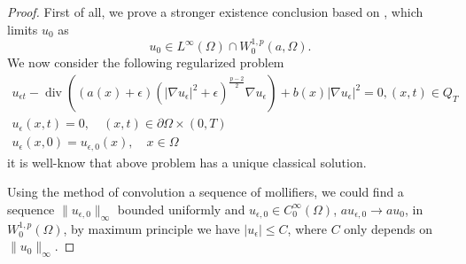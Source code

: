 \documentclass[11pt]{amsart}
\theoremstyle{definition}
\numberwithin{equation}{section}
\newcommand*\abs[1]{\lvert#1\rvert}
\newcommand*\norm[1]{\lVert#1\rVert}
\DeclareMathOperator{\Div}{div}
\begin{document}
\begin{proof}
	First of all, we prove a stronger existence conclusion based on {\cite{Zhan2019Uniquenessa}}, which limits $u_0$ as
	\begin{equation}\label{initial_data_condition_tmp}
		u_0 \in L^{\infty}(\Omega) \cap W_0^{1, p}(a, \Omega).
	\end{equation}
	We now consider the following regularized problem
\begin{gather}
	u_{\epsilon t}-\Div\left((a(x)+\epsilon)
	\left(\left|\nabla u_{\epsilon}\right|^{2}+\epsilon\right)^{\frac{p-2}{2}} \nabla u_{\epsilon}\right)
	+b(x)\left|\nabla u_{\epsilon}\right|^{2} = 0,(x, t) \in Q_{T} \label{eq:approximated_maineq} \\
	u_{\epsilon}(x, t)  = 0, \quad(x, t) \in \partial \Omega \times(0, T)\\
	u_{\epsilon}(x, 0)  = u_{\epsilon, 0}(x), \quad x \in \Omega
\end{gather}
	it is well-know that above problem has a unique classical solution.

	Using the method of convolution a sequence of mollifiers,
	we could find a sequence $\norm{u_{\epsilon, 0}}_{\infty}$ bounded uniformly
	and $u_{\epsilon,0} \in C_0^\infty(\Omega) $, $au_{\epsilon,0} \to au_0 $, in
	$W_0^{1,p}(\Omega) $, by maximum principle we have $\abs{u_{\epsilon}} \leq C$,
	where $C$ only depends on $\norm{u_0}_{\infty} $.


\end{proof}
\end{document}
